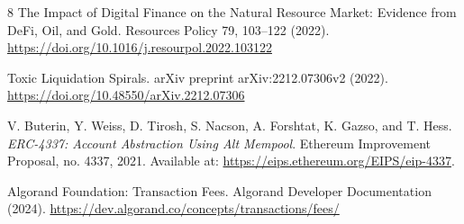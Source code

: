 \documentclass[runningheads]{llncs}
\begin{document}
\begin{thebibliography}{8}
The Impact of Digital Finance on the Natural Resource Market: Evidence from DeFi, Oil, and Gold.
Resources Policy 79, 103--122 (2022).
\url{https://doi.org/10.1016/j.resourpol.2022.103122}

Toxic Liquidation Spirals.
arXiv preprint arXiv:2212.07306v2 (2022).
\url{https://doi.org/10.48550/arXiv.2212.07306}

V. Buterin, Y. Weiss, D. Tirosh, S. Nacson, A. Forshtat, K. Gazso, and T. Hess.
\textit{ERC-4337: Account Abstraction Using Alt Mempool}.
Ethereum Improvement Proposal, no. 4337, 2021.
Available at: \url{https://eips.ethereum.org/EIPS/eip-4337}.

Algorand Foundation: Transaction Fees. Algorand Developer Documentation (2024).
\url{https://dev.algorand.co/concepts/transactions/fees/}

\end{thebibliography}
\end{document}
